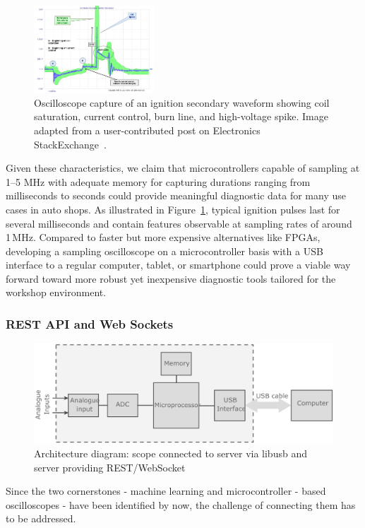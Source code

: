 \begin{figure}[h]
  \centering
  \includegraphics[width=0.4\textwidth]{figures/ignition_pulse.jpeg}
  \caption{Oscilloscope capture of an ignition secondary waveform showing coil saturation, current control, burn line, and high-voltage spike. 
  Image adapted from a user-contributed post on Electronics StackExchange~\cite{stackexchange_ignition}.}
  \label{fig:ignition-scope}
\end{figure}

Given these characteristics, we claim that microcontrollers capable of sampling at 1–5 MHz with adequate memory for capturing durations ranging from 
milliseconds to seconds could provide meaningful diagnostic data for many use cases in auto shops. 
As illustrated in Figure~\ref{fig:ignition-scope}, typical ignition pulses last for several milliseconds and contain features observable at sampling rates of around 1 MHz.
Compared to faster but more expensive alternatives like FPGAs, developing a sampling oscilloscope on a microcontroller basis with a USB interface to a regular computer, 
tablet, or smartphone could prove a viable way forward toward more robust yet inexpensive diagnostic tools tailored for the workshop environment.

\subsubsection{REST API and Web Sockets}
\begin{figure}[ht]
  \centering
  \includegraphics[width=0.8\linewidth]{figures/data_server_architecture.png}
  \caption{Architecture diagram: scope connected to server via libusb and server providing REST/WebSocket}
  \label{fig:data-server}
\end{figure}
Since the two cornerstones - machine learning and microcontroller - based oscilloscopes - have been identified by now, the challenge of connecting them has to be addressed.

